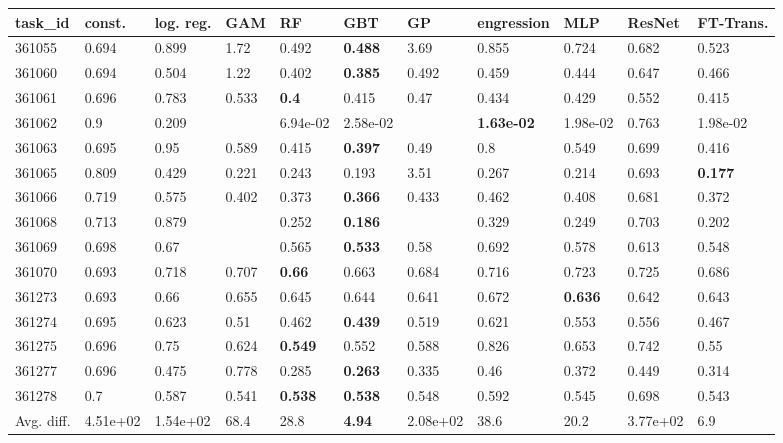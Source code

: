\begin{table}[ht!]
\centering
\begingroup\footnotesize
\begin{tabular}{lllllllllll}
  \hline
\hline
task\_id & const. & log. reg. & GAM & RF & GBT & GP & engression & MLP & ResNet & FT-Trans. \\ 
  \hline
361055 & 0.694 & 0.899 & 1.72 & 0.492 & \textbf{0.488} & 3.69 & 0.855 & 0.724 & 0.682 & 0.523 \\ 
  361060 & 0.694 & 0.504 & 1.22 & 0.402 & \textbf{0.385} & 0.492 & 0.459 & 0.444 & 0.647 & 0.466 \\ 
  361061 & 0.696 & 0.783 & 0.533 & \textbf{0.4} & 0.415 & 0.47 & 0.434 & 0.429 & 0.552 & 0.415 \\ 
  361062 & 0.9 & 0.209 &  & 6.94e-02 & 2.58e-02 &  & \textbf{1.63e-02} & 1.98e-02 & 0.763 & 1.98e-02 \\ 
  361063 & 0.695 & 0.95 & 0.589 & 0.415 & \textbf{0.397} & 0.49 & 0.8 & 0.549 & 0.699 & 0.416 \\ 
  361065 & 0.809 & 0.429 & 0.221 & 0.243 & 0.193 & 3.51 & 0.267 & 0.214 & 0.693 & \textbf{0.177} \\ 
  361066 & 0.719 & 0.575 & 0.402 & 0.373 & \textbf{0.366} & 0.433 & 0.462 & 0.408 & 0.681 & 0.372 \\ 
  361068 & 0.713 & 0.879 &  & 0.252 & \textbf{0.186} &  & 0.329 & 0.249 & 0.703 & 0.202 \\ 
  361069 & 0.698 & 0.67 &  & 0.565 & \textbf{0.533} & 0.58 & 0.692 & 0.578 & 0.613 & 0.548 \\ 
  361070 & 0.693 & 0.718 & 0.707 & \textbf{0.66} & 0.663 & 0.684 & 0.716 & 0.723 & 0.725 & 0.686 \\ 
  361273 & 0.693 & 0.66 & 0.655 & 0.645 & 0.644 & 0.641 & 0.672 & \textbf{0.636} & 0.642 & 0.643 \\ 
  361274 & 0.695 & 0.623 & 0.51 & 0.462 & \textbf{0.439} & 0.519 & 0.621 & 0.553 & 0.556 & 0.467 \\ 
  361275 & 0.696 & 0.75 & 0.624 & \textbf{0.549} & 0.552 & 0.588 & 0.826 & 0.653 & 0.742 & 0.55 \\ 
  361277 & 0.696 & 0.475 & 0.778 & 0.285 & \textbf{0.263} & 0.335 & 0.46 & 0.372 & 0.449 & 0.314 \\ 
  361278 & 0.7 & 0.587 & 0.541 & \textbf{0.538} & \textbf{0.538} & 0.548 & 0.592 & 0.545 & 0.698 & 0.543 \\ 
   \hline
Avg. diff. & 4.51e+02 & 1.54e+02 & 68.4 & 28.8 & \textbf{4.94} & 2.08e+02 & 38.6 & 20.2 & 3.77e+02 & 6.9 \\ 

\end{tabular}
\end{table}
